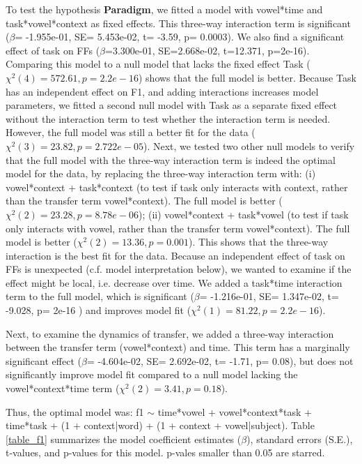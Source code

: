 \documentclass[12 pt]{article}
\begin{document}
To test the hypothesis \textbf{Paradigm}, we fitted a model with vowel*time and task*vowel*context as fixed effects. This three-way interaction term is significant ($\beta$= -1.955e-01, SE=  5.453e-02, t= -3.59, p= 0.0003). We also find a significant effect of task on FFs ($\beta$=3.300e-01, SE=2.668e-02, t=12.371, p=2e-16). Comparing this model to a null model that lacks the fixed effect Task ($\chi^2(4) = 572.61, p=  2.2e-16$) shows that the full model is better. Because Task has an independent effect on F1, and adding interactions increases model parameters, we fitted a second null model with Task as a separate fixed effect without the interaction term to test whether the interaction term is needed. However, the full model was still a better fit for the data ($\chi^2(3) = 23.82, p=  2.722e-05$). Next, we tested two other null models to verify that the full model with the three-way interaction term is indeed the optimal model for the data, by replacing the three-way interaction term with: (i) vowel*context + task*context (to test if task only interacts with context, rather than the transfer term vowel*context). The full model is better ($\chi^2(2) = 23.28, p= 8.78e-06$); (ii) vowel*context + task*vowel (to test if task only interacts with vowel, rather than the transfer term vowel*context). The full model is better ($\chi^2(2) = 13.36, p= 0.001$). This shows that the three-way interaction is the best fit for the data. Because an independent effect of task on FFs is unexpected (c.f. model interpretation below), we wanted to examine if the effect might be local, i.e. decrease over time. We added a task*time interaction term to the full model, which is significant ($\beta$= -1.216e-01, SE=  1.347e-02, t= -9.028, p= 2e-16 ) and improves model fit ($\chi^2(1) = 81.22, p= 2.2e-16$).

Next, to examine the dynamics of transfer, we added a three-way interaction between the transfer term (vowel*context) and time. This term has a marginally significant effect ($\beta$= -4.604e-02, SE=  2.692e-02, t= -1.71, p= 0.08), but does not significantly improve model fit compared to a null model lacking the vowel*context*time term ($\chi^2(2) = 3.41, p= 0.18$).

Thus, the optimal model was: f1 $\sim$ time*vowel + vowel*context*task + time*task + (1 + context|word) + (1 + context + vowel|subject). Table \ref{table_f1} summarizes the model coefficient estimates ($\beta$), standard errors (S.E.), t-values, and p-values for this model. p-vales smaller than 0.05 are starred. 
\end{document}
